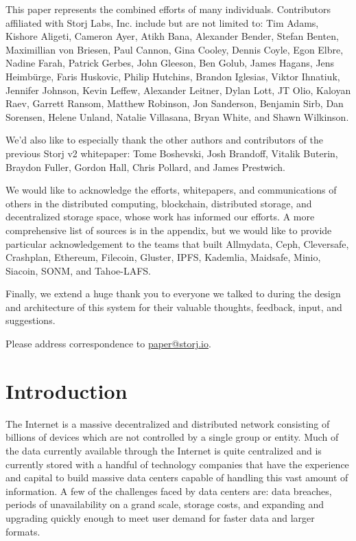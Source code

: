 \documentclass[8pt,fleqn,openany]{book}
\begin{document}
This paper represents the combined efforts of many individuals.
Contributors affiliated with Storj Labs, Inc. include but are not limited to:
Tim Adams,
Kishore Aligeti,
Cameron Ayer,
Atikh Bana,
Alexander Bender,
Stefan Benten,
Maximillian von Briesen,
Paul Cannon,
Gina Cooley,
Dennis Coyle,
Egon Elbre,
Nadine Farah,
Patrick Gerbes,
John Gleeson,
Ben Golub,
James Hagans,
Jens Heimbürge,
Faris Huskovic,
Philip Hutchins,
Brandon Iglesias,
Viktor Ihnatiuk,
Jennifer Johnson,
Kevin Leffew,
Alexander Leitner,
Dylan Lott,
JT Olio,
Kaloyan Raev,
Garrett Ransom,
Matthew Robinson,
Jon Sanderson,
Benjamin Sirb,
Dan Sorensen,
Helene Unland,
Natalie Villasana,
Bryan White,
and Shawn Wilkinson.

We'd also like to especially thank the other authors and contributors of the
previous Storj v2 whitepaper:
Tome Boshevski,
Josh Brandoff,
Vitalik Buterin,
Braydon Fuller,
Gordon Hall,
Chris Pollard,
and James Prestwich.

We would like to acknowledge the efforts, whitepapers, and communications of
others in the distributed computing, blockchain, distributed storage, and
decentralized storage space, whose work has informed our efforts. A more
comprehensive list of sources is in the appendix, but we would like to provide
particular acknowledgement to the teams that built
Allmydata,
Ceph,
Cleversafe,
Crashplan,
Ethereum,
Filecoin,
Gluster,
IPFS,
Kademlia,
Maidsafe,
Minio,
Siacoin,
SONM,
and Tahoe-LAFS.

Finally, we extend a huge thank you to everyone we talked to during the
design and architecture of this system for their valuable thoughts, feedback,
input, and suggestions.

Please address correspondence to \href{mailto:paper@storj.io}{paper@storj.io}.

\chapter{Introduction}\label{chap:intro}

The Internet is a massive decentralized and distributed network consisting of
billions of devices which are not controlled by a single group or entity.
Much of the data currently available through the Internet is quite centralized and is currently stored with a handful of technology companies that have the
experience and capital to build massive data centers capable of handling this
vast amount of information.
A few of the challenges faced by data centers are: data breaches, periods of
unavailability on a grand scale, storage costs, and expanding and upgrading quickly enough to meet user demand for faster data and larger formats.
\end{document}
